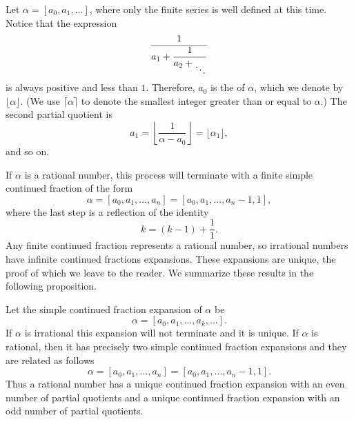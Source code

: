 Let $\alpha = [a_0, a_1, \ldots]$, where only the finite
series is well defined at this time.  Notice that the expression
\[
\frac{1}{\displaystyle a_1 + \frac{1}{a_2  + \Ddots}}
\]
is always positive and less than $1$.  Therefore, $a_0$ is the
 of $\alpha$, which we denote by 
$\lfloor \alpha \rfloor$.  (We use $\lceil \alpha \rceil$ to denote
the smallest integer greater than or equal to $\alpha$.)  The second
partial quotient is
\[
a_1 = \left\lfloor \frac{1}{\alpha - a_0} \right \rfloor = \lfloor
\alpha_1 \rfloor,
\]
and so on. 


If $\alpha$ is a rational number, this process will terminate with a
finite simple continued fraction of the form
\[
\alpha = [a_0, a_1, \ldots, a_n ] = [a_0, a_1, \ldots, a_n -1, 1],
\]
where the last step is a reflection of the identity
\[
k = (k-1) + \frac{1}{1}.
\]
Any finite continued fraction represents a rational number, so 
irrational numbers have infinite continued fractions expansions.
These expansions are unique, the proof of which we leave to the
reader.  We summarize these results in the following proposition.

\begin{proposition}
Let the simple continued fraction expansion of $\alpha$ be
\[
\alpha = [a_0, a_1, \ldots, a_k, \ldots ].
\]
If $\alpha$ is irrational this expansion will not terminate and it is
unique.  If $\alpha$ is rational, then it has precisely two simple
continued fraction expansions and they are related as follows
\[
\alpha = [a_0, a_1, \ldots, a_n] = [a_0, a_1, \ldots, a_n-1, 1].
\]
Thus a rational number has a unique continued fraction expansion with
an even number of partial quotients and a unique continued fraction
expansion with an odd number of partial quotients.

\end{proposition}

